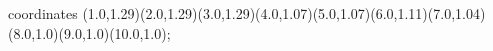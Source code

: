 					coordinates { (1.0,1.29)(2.0,1.29)(3.0,1.29)(4.0,1.07)(5.0,1.07)(6.0,1.11)(7.0,1.04)(8.0,1.0)(9.0,1.0)(10.0,1.0)};
